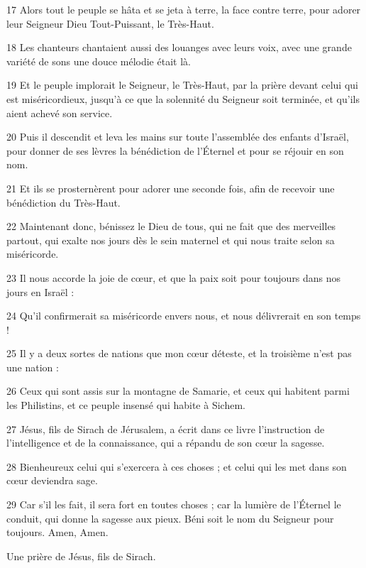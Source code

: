 \par 17 Alors tout le peuple se hâta et se jeta à terre, la face contre terre, pour adorer leur Seigneur Dieu Tout-Puissant, le Très-Haut.
\par 18 Les chanteurs chantaient aussi des louanges avec leurs voix, avec une grande variété de sons une douce mélodie était là.
\par 19 Et le peuple implorait le Seigneur, le Très-Haut, par la prière devant celui qui est miséricordieux, jusqu'à ce que la solennité du Seigneur soit terminée, et qu'ils aient achevé son service.
\par 20 Puis il descendit et leva les mains sur toute l'assemblée des enfants d'Israël, pour donner de ses lèvres la bénédiction de l'Éternel et pour se réjouir en son nom.
\par 21 Et ils se prosternèrent pour adorer une seconde fois, afin de recevoir une bénédiction du Très-Haut.
\par 22 Maintenant donc, bénissez le Dieu de tous, qui ne fait que des merveilles partout, qui exalte nos jours dès le sein maternel et qui nous traite selon sa miséricorde.
\par 23 Il nous accorde la joie de cœur, et que la paix soit pour toujours dans nos jours en Israël :
\par 24 Qu'il confirmerait sa miséricorde envers nous, et nous délivrerait en son temps !
\par 25 Il y a deux sortes de nations que mon cœur déteste, et la troisième n'est pas une nation :
\par 26 Ceux qui sont assis sur la montagne de Samarie, et ceux qui habitent parmi les Philistins, et ce peuple insensé qui habite à Sichem.
\par 27 Jésus, fils de Sirach de Jérusalem, a écrit dans ce livre l'instruction de l'intelligence et de la connaissance, qui a répandu de son cœur la sagesse.
\par 28 Bienheureux celui qui s'exercera à ces choses ; et celui qui les met dans son cœur deviendra sage.
\par 29 Car s'il les fait, il sera fort en toutes choses ; car la lumière de l'Éternel le conduit, qui donne la sagesse aux pieux. Béni soit le nom du Seigneur pour toujours. Amen, Amen.


\par Une prière de Jésus, fils de Sirach.

